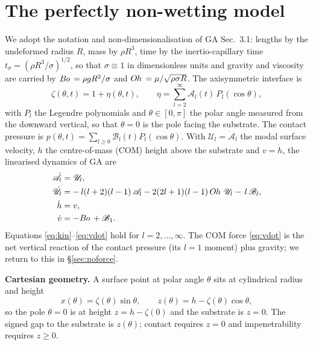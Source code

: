 \documentclass{jfm}
\newcommand{\be}{\begin{equation}}
\newcommand{\ee}{\end{equation}}
\newcommand{\Bo}{B\kern-0.05em o\,}
\newcommand{\Oh}{O\kern-0.05em h\,}
\begin{document}
\section{The perfectly non-wetting model}\label{sec:background}

We adopt the notation and non-dimensionalisation of GA Sec.~3.1: lengths by the
undeformed radius $R$, mass by $\rho R^3$, time by the inertio-capillary time
$t_\sigma=(\rho R^3/\sigma)^{1/2}$, so that $\sigma\equiv1$ in dimensionless units and
gravity and viscosity are carried by $\Bo=\rho g R^2/\sigma$ and
$\Oh=\mu/\sqrt{\rho\sigma R}$. The axisymmetric interface is
\be\label{eq:shape}
\zeta(\theta,t)=1+\eta(\theta,t),\qquad
\eta=\sum_{l=2}^{\infty}\mathscr{A}_l(t)\,P_l(\cos\theta),
\ee
with $P_l$ the Legendre polynomials and $\theta\in[0,\pi]$ the polar angle measured from
the downward vertical, so that $\theta=0$ is the pole facing the substrate. The contact
pressure is $p(\theta,t)=\sum_{l\ge0}\mathscr{B}_l(t)P_l(\cos\theta)$. With
$\mathscr{U}_l=\dot{\mathscr A}_l$ the modal surface velocity, $h$ the centre-of-mass
(COM) height above the substrate and $v=\dot h$, the linearised dynamics of GA are
\begin{align}
\dot{\mathscr A}_l &= \mathscr U_l, \label{eq:kin}\\
\dot{\mathscr U}_l &= -\,l(l+2)(l-1)\,\mathscr A_l
                      -2(2l+1)(l-1)\,\Oh\,\mathscr U_l
                      -\,l\,\mathscr B_l, \label{eq:mode}\\
\dot h &= v, \label{eq:hdot}\\
\dot v &= -\Bo + \mathscr B_1. \label{eq:vdot}
\end{align}
Equations \eqref{eq:kin}--\eqref{eq:vdot} hold for $l=2,\dots,\infty$. The COM force
\eqref{eq:vdot} is the net vertical reaction of the contact pressure (its $l=1$ moment)
plus gravity; we return to this in \S\ref{sec:noforce}.

\medskip\noindent\textbf{Cartesian geometry.} A surface point at polar angle $\theta$
sits at cylindrical radius and height
\be\label{eq:cart}
x(\theta)=\zeta(\theta)\sin\theta,\qquad
z(\theta)=h-\zeta(\theta)\cos\theta,
\ee
so the pole $\theta=0$ is at height $z=h-\zeta(0)$ and the substrate is $z=0$. The
signed gap to the substrate is $z(\theta)$; contact requires $z=0$ and impenetrability
requires $z\ge 0$.
\end{document}
